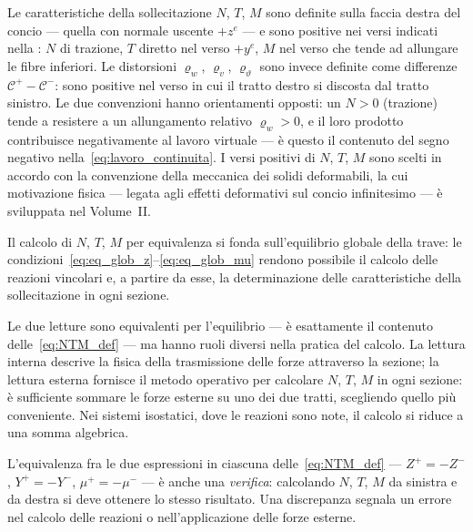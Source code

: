 \begin{oss}
	Le caratteristiche della sollecitazione $N$, $T$, $M$
	sono definite sulla faccia destra del concio ---
	quella con normale uscente $+z^e$ --- e sono positive
	nei versi indicati nella :
	$N$ di trazione, $T$ diretto nel verso $+y^e$, $M$
	nel verso che tende ad allungare le fibre inferiori.
	Le distorsioni $\varrho_w$, $\varrho_v$,
	$\varrho_\vartheta$ sono invece definite come
	differenze $\mathcal{C}^+ - \mathcal{C}^-$: sono
	positive nel verso in cui il tratto destro si
	discosta dal tratto sinistro.
	Le due convenzioni hanno orientamenti opposti:
	un $N > 0$ (trazione) tende a resistere a un
	allungamento relativo $\varrho_w > 0$, e il loro
	prodotto contribuisce negativamente al lavoro
	virtuale --- è questo il contenuto del segno
	negativo nella~\eqref{eq:lavoro_continuita}.
	I versi positivi di $N$, $T$, $M$ sono scelti in
	accordo con la convenzione della meccanica dei
	solidi deformabili, la cui motivazione fisica ---
	legata agli effetti deformativi sul concio
	infinitesimo --- è sviluppata nel Volume~II.
\end{oss}


\begin{oss}
	Il calcolo di $N$, $T$, $M$ per equivalenza
	si fonda sull'equilibrio globale della trave:
	le condizioni~\eqref{eq:eq_glob_z}--\eqref{eq:eq_glob_mu}
	rendono possibile il calcolo delle reazioni
	vincolari e, a partire da esse, la determinazione
	delle caratteristiche della sollecitazione
	in ogni sezione.
\end{oss}

\begin{oss}
	Le due letture sono equivalenti per l'equilibrio
	--- è esattamente il contenuto
	delle~\eqref{eq:NTM_def} --- ma hanno ruoli
	diversi nella pratica del calcolo. La lettura
	interna descrive la fisica della trasmissione
	delle forze attraverso la sezione; la lettura
	esterna fornisce il metodo operativo per
	calcolare $N$, $T$, $M$ in ogni sezione:
	è sufficiente sommare le forze esterne su uno
	dei due tratti, scegliendo quello più conveniente.
	Nei sistemi isostatici, dove le reazioni sono
	note, il calcolo si riduce a una somma algebrica.
\end{oss}

\begin{oss}
	L'equivalenza fra le due espressioni in
	ciascuna delle~\eqref{eq:NTM_def} --- 
	$Z^+ = -Z^-$, $Y^+ = -Y^-$, $\mu^+ = -\mu^-$
	--- è anche una \emph{verifica}: calcolando
	$N$, $T$, $M$ da sinistra e da destra si deve
	ottenere lo stesso risultato. Una discrepanza
	segnala un errore nel calcolo delle reazioni
	o nell'applicazione delle forze esterne.
\end{oss}


